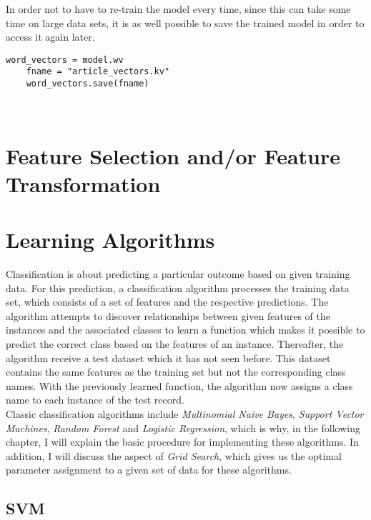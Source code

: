 \documentclass[a4paper, 11pt,titlepage,oneside,openany]{book}
\begin{document}
\noindent In order not to have to re-train the model every time, since this can take some time on large data sets, it is as well possible to save the trained model in order to access it again later.\\
\noindent
\begin{minipage}{\linewidth}
	\begin{lstlisting}[frame=single]
	word_vectors = model.wv
	fname = "article_vectors.kv"
	word_vectors.save(fname)
	\end{lstlisting}
\end{minipage} \\
\section{Feature Selection and/or Feature Transformation}
\section{Learning Algorithms}
Classification is about predicting a particular outcome based on given training data. For this prediction, a classification algorithm processes the training data set, which consists of a set of features and the respective predictions. The algorithm attempts to discover relationships between given features  of the instances and the associated classes to learn a function which makes it possible to predict the correct class based on the features of an instance. Thereafter, the algorithm receive a test dataset which it has not seen before. This dataset contains the same features as the training set but not the corresponding class names. With the previously learned function, the algorithm now assigns a class name to each instance  of the test record. \\
\noindent Classic classification algorithms include \textit{Multinomial Naive Bayes}, \textit{Support Vector Machines}, \textit{Random Forest} and \textit{Logistic Regression}, which is why, in the following chapter, I will explain the basic procedure for implementing these algorithms. In addition, I will discuss the aspect of \textit{Grid Search}, which gives us the optimal parameter assignment to a given set of data for these algorithms.
\subsection{SVM}
\end{document}
